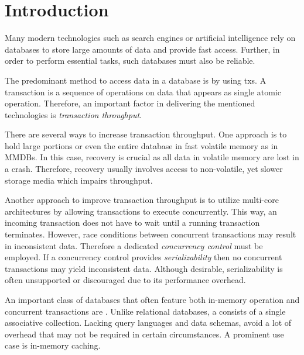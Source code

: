 \chapter{Introduction}
\label{ch:intro}



Many modern technologies such as search engines or artificial intelligence rely
on databases to store large amounts of data and provide fast access. Further, in
order to perform essential tasks, such databases must also be reliable.

The predominant method to access data in a database is by using \glspl{tx}. A
transaction is a sequence of operations on data that appears as single atomic
operation. Therefore, an important factor in delivering the mentioned
technologies is \emph{transaction throughput}.

There are several ways to increase transaction throughput. One approach is to
hold large portions or even the entire database in fast volatile memory as in
\acp{MMDB}. In this case, recovery is crucial as all data in volatile memory are
lost in a crash. Therefore, recovery usually involves access to non-volatile,
yet slower storage media which impairs throughput.

Another approach to improve transaction throughput is to utilize multi-core
architectures by allowing transactions to execute concurrently. This way, an
incoming transaction does not have to wait until a running transaction
terminates. However, race conditions between concurrent transactions may result
in inconsistent data. Therefore a dedicated \emph{concurrency control} must be
employed. If a concurrency control provides \emph{serializability} then no
concurrent transactions may yield inconsistent data. Although desirable,
serializability is often unsupported or discouraged due to its performance
overhead.

An important class of databases that often feature both in-memory operation and
concurrent transactions are \emph{\kvsp}. Unlike relational databases, a \kvs
consists of a single associative collection. Lacking query languages and data
schemas, \kvsp avoid a lot of overhead that may not be required in certain
circumstances. A prominent use case is in-memory caching.


